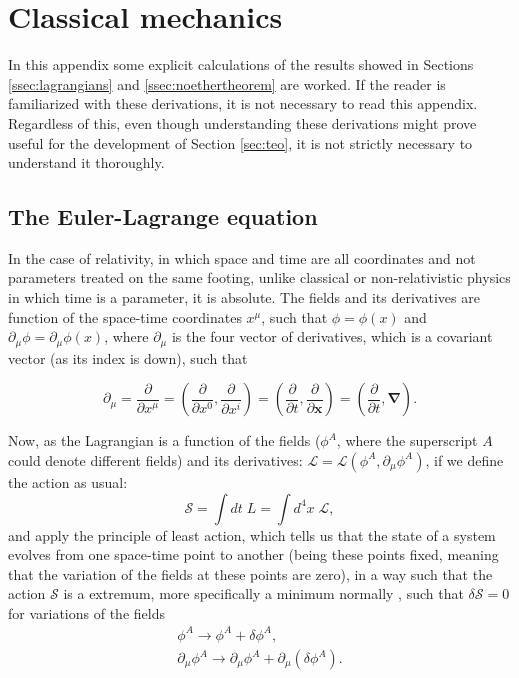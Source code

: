 \clearpage
\section{Classical mechanics} 
\label{app:A}

In this appendix some explicit calculations of the results showed in Sections \ref{ssec:lagrangians} and \ref{ssec:noethertheorem} are worked. If the reader is familiarized with these derivations, it is not necessary to read this appendix. Regardless of this, even though understanding these derivations might prove useful for the development of Section \ref{sec:teo}, it is not strictly necessary to understand it thoroughly.

\subsection{The Euler-Lagrange equation}

In the case of relativity, in which space and time are all coordinates and not parameters treated on the same footing, unlike classical or non-relativistic physics in which time is a parameter, it is absolute. The fields and its derivatives are function of the space-time coordinates $x^{\mu}$, such that $\phi=\phi(x)$ and $\partial_{\mu}\phi = \partial_{\mu}\phi(x)$, where $\partial_{\mu}$ is the four vector of derivatives, which is a covariant vector (as its index is down), such that

\begin{equation*}
    \partial_{\mu} = \dfrac{\partial}{\partial x^{\mu}} = \left( \dfrac{\partial}{\partial x^0}, \dfrac{\partial}{\partial x^i}\right) = \left( \dfrac{\partial}{\partial t}, \dfrac{\partial}{\partial \bm{x}} \right) = \left( \dfrac{\partial}{\partial t}, \bm{\nabla} \right).
\end{equation*}

Now, as the Lagrangian is a function of the fields ($\phi^A$, where the superscript $A$ could denote different fields) and its derivatives: $\mathcal{L} = \mathcal{L}(\phi^A,\partial_{\mu}\phi^A)$, if we define the action as usual:
\begin{equation*}
    \mathcal{S} = \int dt \; L = \int d^4x \; \mathcal{L},
\end{equation*}
and apply the principle of least action, which tells us that the state of a system evolves from one space-time point to another (being these points fixed, meaning that the variation of the fields at these points are zero), in a way such that the action $\mathcal{S}$ is a extremum, more specifically a minimum normally \cite{Peskin}, such that $\delta\mathcal{S} = 0$ for variations of the fields
\begin{gather*}
    \phi^A \rightarrow \phi^A + \delta\phi^A, \\
    \partial_{\mu}\phi^A \rightarrow \partial_{\mu}\phi^A + \partial_{\mu}(\delta\phi^A).
\end{gather*}


